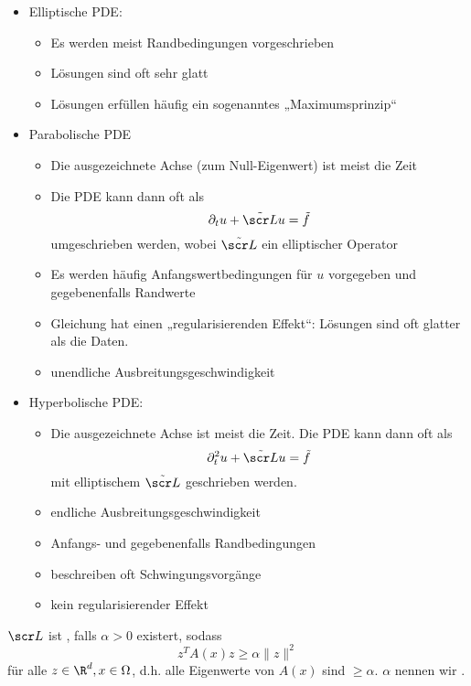 \begin{itemize}
	\item
		Elliptische PDE:
		\begin{itemize}
			\item
				Es werden meist Randbedingungen vorgeschrieben
			\item
				Lösungen sind oft sehr glatt
			\item
				Lösungen erfüllen häufig ein sogenanntes „Maximumsprinzip“
		\end{itemize}
	\item
		Parabolische PDE
		\begin{itemize}
			\item
				Die ausgezeichnete Achse (zum Null-Eigenwert) ist meist die Zeit
			\item
				Die PDE kann dann oft als
				\[
					\partial_t u + \tilde{\scr L} u = \tilde f
				\]
				umgeschrieben werden, wobei $\tilde{\scr L}$ ein elliptischer Operator
			\item
				Es werden häufig Anfangswertbedingungen für $u$ vorgegeben und gegebenenfalls Randwerte
			\item
				Gleichung hat einen „regularisierenden Effekt“:
				Lösungen sind oft glatter als die Daten.
			\item
				unendliche Ausbreitungsgeschwindigkeit
		\end{itemize}
	\item
		Hyperbolische PDE:
		\begin{itemize}
			\item
				Die ausgezeichnete Achse ist meist die Zeit.
				Die PDE kann dann oft als
				\[
					\partial_t^2 u + \tilde{\scr L} u = \tilde f
				\]
				mit elliptischem $\tilde{\scr L}$ geschrieben werden.
			\item
				endliche Ausbreitungsgeschwindigkeit
			\item
				Anfangs- und gegebenenfalls Randbedingungen
			\item
				beschreiben oft Schwingungsvorgänge
			\item
				kein regularisierender Effekt
		\end{itemize}
\end{itemize}

\begin{df} \label{1.17}
	$\scr L$ ist , falls $\alpha > 0$ existert, sodass
	\[
		z^T A(x) z \ge \alpha \|z\|^2
	\]
	für alle $z \in \R^d, x \in \Omega$, d.h. alle Eigenwerte von $A(x)$ sind $\ge \alpha$.
	$\alpha$ nennen wir .
\end{df}


